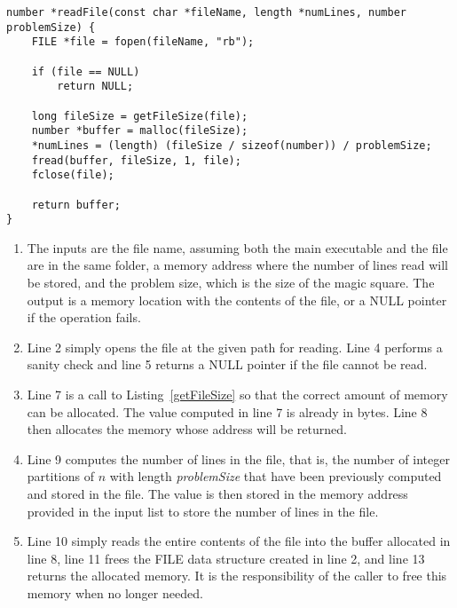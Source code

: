 \begin{lstlisting}[caption={Reading the contents of a file.},label={readFile}]
number *readFile(const char *fileName, length *numLines, number problemSize) {
    FILE *file = fopen(fileName, "rb");

    if (file == NULL)
        return NULL;

    long fileSize = getFileSize(file);
    number *buffer = malloc(fileSize);
    *numLines = (length) (fileSize / sizeof(number)) / problemSize;
    fread(buffer, fileSize, 1, file);
    fclose(file);

    return buffer;
}
\end{lstlisting}

\begin{enumerate}
\item The inputs are the file name, assuming both the main executable and the file are in the same folder, a memory address where the number of lines read will be stored, and the problem size, which is the size of the magic square. The output is a memory location with the contents of the file, or a NULL pointer if the operation fails.
\item Line 2 simply opens the file at the given path for reading. Line 4 performs a sanity check and line 5 returns a NULL pointer if the file cannot be read.
\addtocounter{enumi}{4}
\item Line 7 is a call to Listing~\ref{getFileSize} so that the correct amount of memory can be allocated. The value computed in line 7 is already in bytes. Line 8 then allocates the memory whose address will be returned.
\addtocounter{enumi}{1}
\item Line 9 computes the number of lines in the file, that is, the number of integer partitions of $n$ with length \emph{problemSize} that have been previously computed and stored in the file. The value is then stored in the memory address provided in the input list to store the number of lines in the file.
\item Line 10 simply reads the entire contents of the file into the buffer allocated in line 8, line 11 frees the FILE data structure created in line 2, and line 13 returns the allocated memory. It is the responsibility of the caller to free this memory when no longer needed.
\end{enumerate}

